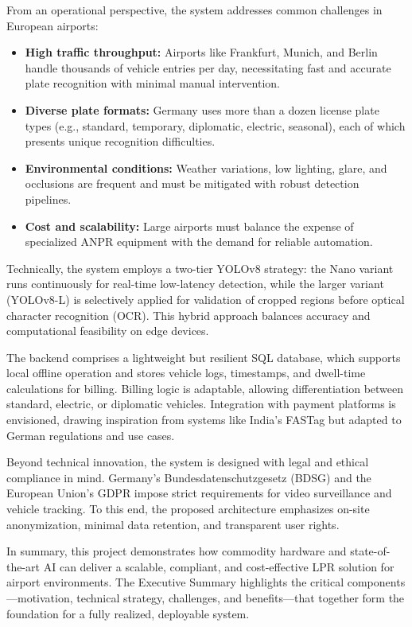 	From an operational perspective, the system addresses common challenges in European airports:
	\begin{itemize}
		\item \textbf{High traffic throughput:} Airports like Frankfurt, Munich, and Berlin handle thousands of vehicle entries per day, necessitating fast and accurate plate recognition with minimal manual intervention. 
		\item \textbf{Diverse plate formats:} Germany uses more than a dozen license plate types (e.g., standard, temporary, diplomatic, electric, seasonal), each of which presents unique recognition difficulties.
		\item \textbf{Environmental conditions:} Weather variations, low lighting, glare, and occlusions are frequent and must be mitigated with robust detection pipelines. 
		\item \textbf{Cost and scalability:} Large airports must balance the expense of specialized ANPR equipment with the demand for reliable automation.
	\end{itemize}
	
	Technically, the system employs a two-tier YOLOv8 strategy: the Nano variant runs continuously for real-time low-latency detection, while the larger variant (YOLOv8-L) is selectively applied for validation of cropped regions before optical character recognition (OCR). This hybrid approach balances accuracy and computational feasibility on edge devices. 
	
	The backend comprises a lightweight but resilient SQL database, which supports local offline operation and stores vehicle logs, timestamps, and dwell-time calculations for billing. Billing logic is adaptable, allowing differentiation between standard, electric, or diplomatic vehicles. Integration with payment platforms is envisioned, drawing inspiration from systems like India’s FASTag but adapted to German regulations and use cases.
	
	Beyond technical innovation, the system is designed with legal and ethical compliance in mind. Germany’s Bundesdatenschutzgesetz (BDSG) and the European Union’s GDPR impose strict requirements for video surveillance and vehicle tracking. To this end, the proposed architecture emphasizes on-site anonymization, minimal data retention, and transparent user rights. 
	
	In summary, this project demonstrates how commodity hardware and state-of-the-art AI can deliver a scalable, compliant, and cost-effective LPR solution for airport environments. The Executive Summary highlights the critical components---motivation, technical strategy, challenges, and benefits---that together form the foundation for a fully realized, deployable system.
	

